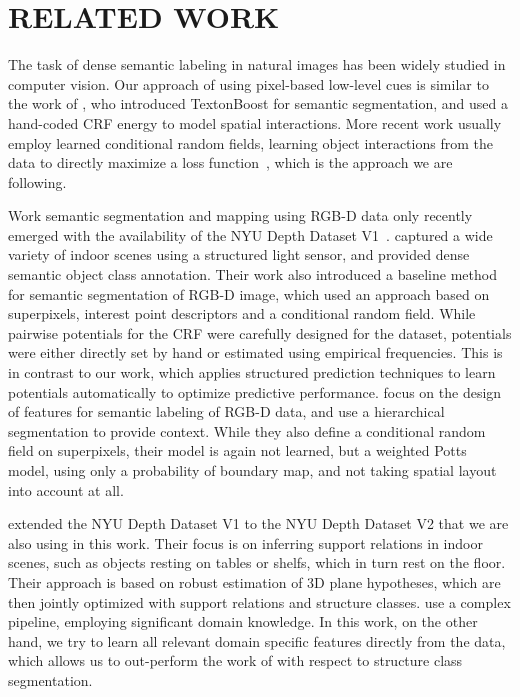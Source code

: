 \documentclass[a4paper, 10pt, conference]{ieeeconf}      %
\begin{document}
\section{RELATED WORK}
The task of dense semantic labeling in natural images has been widely studied
in computer vision.  Our approach of using pixel-based low-level cues is
similar to the work of \citet{shotton2006textonboost}, who introduced
TextonBoost for semantic segmentation, and used a hand-coded CRF energy to
model spatial interactions. More recent work usually employ learned conditional
random fields, learning object interactions from the
data to directly maximize a loss function~\citep{lucchi2013learning, krahenbuhl2012efficient},
which is the approach we are following.

Work semantic segmentation and mapping using RGB-D data only recently emerged with
the availability of the NYU Depth Dataset V1~\citep{silberman2011indoor}.
\citet{silberman2011indoor} captured a wide variety of indoor scenes using a structured light sensor,
and provided dense semantic object class annotation. Their work also introduced a baseline method
for semantic segmentation of RGB-D image, which used an approach based on superpixels, interest
point descriptors and a conditional random field. While pairwise potentials for the CRF were carefully
designed for the dataset, potentials were either directly set by hand or estimated using empirical
frequencies. This is in contrast to our work, which applies structured prediction techniques
to learn potentials automatically to optimize predictive performance.
\citet{ren2012rgb} focus on the design of features for semantic labeling of RGB-D data, and use
a hierarchical segmentation to provide context. While they also define a conditional random field on superpixels,
their model is again not learned, but a weighted Potts model, using only a
probability of boundary map, and not taking spatial layout into account at all.

\citet{SilbermanECCV12} extended the NYU Depth Dataset V1 to the NYU Depth Dataset V2 that we are also
using in this work.  Their focus is on inferring support relations in indoor
scenes, such as objects resting on tables or shelfs, which in turn rest on the floor.
Their approach is based on robust estimation of 3D plane hypotheses, which are then jointly
optimized with support relations and structure classes.
\citet{SilbermanECCV12} use a complex pipeline, employing significant domain knowledge.
In this work, on the other hand, we try to learn all relevant domain specific features
directly from the data, which allows us to out-perform the work of \citet{SilbermanECCV12}
with respect to structure class segmentation.
\end{document}
